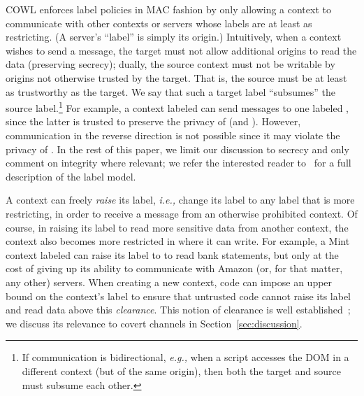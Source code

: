 COWL enforces label policies in MAC fashion by only allowing a context
to communicate with other contexts or servers whose labels are at
least as restricting. (A server's ``label'' is simply its origin.)
%
Intuitively, when a context wishes to send a message, the target must
not allow additional origins to read the data (preserving secrecy);
dually, the source context must not be writable by origins not
otherwise trusted by the target. That is, the source must be at least
as trustworthy as the target.
%
We say that such a target label ``subsumes'' the source
label.\footnote{ If communication is bidirectional, \emph{e.g.,} when a
  script accesses the DOM in a different context (but of the same
  origin), then both the target and source must subsume each other.}
%
For example, a context labeled
 can send messages to
one labeled , since the latter is trusted
to preserve the privacy of  (and
).
%
However, communication in the reverse direction is not possible since
it may violate the privacy of .
%
In the rest of this paper, we limit our discussion to secrecy and only
comment on integrity where relevant; we refer the interested reader
to~\cite{stefan:2011:dclabels} for a full description of the label
model.

A context can freely \emph{raise} its label, \emph{i.e.,} change its label to
any label that is more restricting, in order to receive a message
from an otherwise prohibited context.
%
Of course, in raising its label to read more sensitive data from
another context, the context also becomes more restricted in where it
can write.
%
For example, a Mint context labeled
 can raise its label to
 to read bank statements, but
only at the cost of giving up its ability to communicate with Amazon
(or, for that matter, any other) servers.
%
When creating a new context, code can impose an upper bound on the
context's label to ensure that untrusted code cannot raise its label
and read data above this \emph{clearance}.
%
This notion of clearance is well
established~\cite{efstathopoulos:asbestos, Zeldovich:2006,
  stefan:2011:flexible, Breeze13}; we discuss its relevance to covert
channels in Section~\ref{sec:discussion}.

